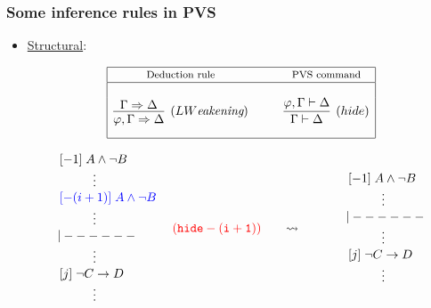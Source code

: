 \documentclass[10pt]{beamer}
\begin{document}
\begin{frame}
\begin{itemize}
\end{itemize}

\end{frame}

\begin{frame}
\frametitle{Some inference rules in PVS}
	\begin{itemize}
		\item \underline{{\color{blue}Structural}}:
{\scriptsize
\begin{table}
\vspace{-7mm}
\[\begin{array}{|c@{\hspace{1cm}}c|}
\hline
\mbox{\footnotesize Deduction rule} & \mbox{\footnotesize PVS command} \\
\hline
&\\
\infer[(LW\mbox{\it eakening})]{\varphi,\Gamma\Rightarrow\Delta}{\Gamma\Rightarrow\Delta} & 
\infer[(hide)]{\Gamma\vdash\Delta}{\varphi,\Gamma\vdash\Delta} \\[3mm]
\hline
\end{array}\]
\end{table}
}

{\footnotesize
\[\begin{array}{l}
    \,[-1]\; A \wedge \neg B \\
    \hspace{10mm}\vdots\\
    \,{\color{blue}[-(i+1)]\; A \wedge \neg B} \\
    \hspace{10mm}\vdots\\
     {\small{\tt{|------}}}\\
    \hspace{10mm} \vdots\\
    \,[j]\;  \neg C\rightarrow D \\
    \hspace{10mm} \vdots\\
  \end{array}      
  \hspace{1mm}
  \begin{array}{c}{\color{red}{\tt (hide -(i+1))}}\hspace{6mm}\rightsquigarrow\end{array}
  \hspace{10mm}
  \begin{array}{l}
    \,[-1]\; A \wedge \neg B \\
    \hspace{10mm}\vdots\\
     {\small{\tt{|------}}} \\
    \hspace{10mm} \vdots\\
    \,[j]\;  \neg C\rightarrow D \\
    \hspace{10mm} \vdots\\
  \end{array}         
  \]
}

\end{itemize}
\end{frame}
\end{document}
